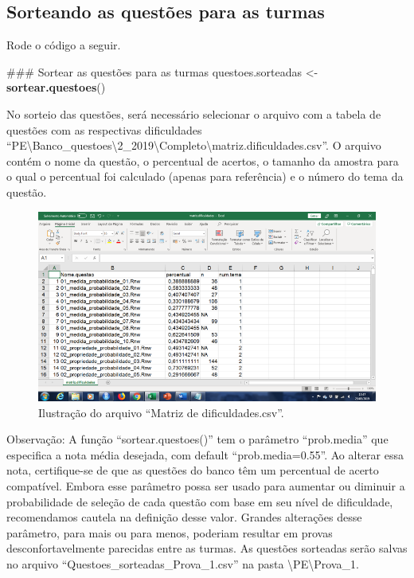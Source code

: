 \documentclass[a4paper]{report}
\newenvironment{Shaded}{\begin{snugshade}}{\end{snugshade}}
\newcommand{\KeywordTok}[1]{\textcolor[rgb]{0.13,0.29,0.53}{\textbf{#1}}}
\newcommand{\StringTok}[1]{\textcolor[rgb]{0.31,0.60,0.02}{#1}}
\newcommand{\NormalTok}[1]{#1}
\begin{document}
\subsection{Sorteando as questões para as turmas} \label{subsec:sorteio}

Rode o código a seguir.

\begin{Shaded}
\begin{Highlighting}[]
\NormalTok{### Sortear as questões para as turmas}
\NormalTok{questoes.sorteadas <-}\StringTok{ }\KeywordTok{sortear.questoes}\NormalTok{()}
\end{Highlighting}
\end{Shaded}

No sorteio das questões, será necessário selecionar o arquivo com a
tabela de questões com as respectivas dificuldades
``PE\textbackslash{}Banco\_questoes\textbackslash{}2\_2019\textbackslash{}Completo\textbackslash{}matriz.dificuldades.csv''.
O arquivo contém o nome da questão, o percentual de acertos, o tamanho
da amostra para o qual o percentual foi calculado (apenas para
referência) e o número do tema da questão.

\begin{figure}
\centering
\includegraphics{imagens/arquivo_dificuldades.png}
\caption{Ilustração do arquivo ``Matriz de dificuldades.csv''.}
\end{figure}

Observação: A função ``sortear.questoes()'' tem o parâmetro
``prob.media'' que especifica a nota média desejada, com default
``prob.media=0.55''. Ao alterar essa nota, certifique-se de que as
questões do banco têm um percentual de acerto compatível. Embora esse
parâmetro possa ser usado para aumentar ou diminuir a probabilidade de
seleção de cada questão com base em seu nível de dificuldade,
recomendamos cautela na definição desse valor. Grandes alterações desse
parâmetro, para mais ou para menos, poderiam resultar em provas
desconfortavelmente parecidas entre as turmas. As questões sorteadas
serão salvas no arquivo ``Questoes\_sorteadas\_Prova\_1.csv'' na pasta
\textbackslash{}PE\textbackslash{}Prova\_1.
\end{document}
